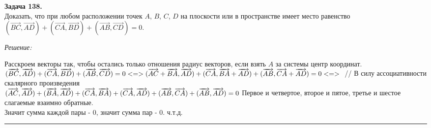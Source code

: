 \documentclass[a4paper, 12pt]{article}
\newenvironment{problem}[2][Задача]
    { \begin{mdframed}[backgroundcolor=gray!10] \textbf{#1 #2.} \\}
    {  \end{mdframed}}
\newenvironment{solution}
    {\textit{Решение: }}
    {\noindent\rule{7in}{1.5pt}}
\begin{document}
\begin{problem}{138}
Доказать, что при любом расположении точек $A$, $B$, $C$, $D$ на плоскости или в пространстве имеет место равенство
$(\overrightarrow{BC},\overrightarrow{AD})+(\overrightarrow{CA},\overrightarrow{BD})+(\overrightarrow{AB},\overrightarrow{CD})=0$.
\end{problem}
\begin{solution}

Расскроем векторы так, чтобы остались только отношения радиус векторов, если взять $A$ за системы центр координат. \\
$
(\overrightarrow{BC},\overrightarrow{AD}) +
(\overrightarrow{CA},\overrightarrow{BD}) +
(\overrightarrow{AB},\overrightarrow{CD}) = 0
<=> \\
(\overrightarrow{AC}+\overrightarrow{BA},\overrightarrow{AD}) +
(\overrightarrow{CA},\overrightarrow{BA} + \overrightarrow{AD}) +
(\overrightarrow{AB},\overrightarrow{CA} + \overrightarrow{AD}) = 0
<=> \\
$
// В силу ассоциативности скалярного произведения \\
$
(\overrightarrow{AC}, \overrightarrow{AD}) + (\overrightarrow{BA}, \overrightarrow{AD}) +
(\overrightarrow{CA}, \overrightarrow{BA}) + (\overrightarrow{CA}, \overrightarrow{AD}) +
(\overrightarrow{AB}, \overrightarrow{CA}) + (\overrightarrow{AB}, \overrightarrow{AD}) = 0 \\
$
Первое и четвертое, второе и пятое, третье и шестое слагаемые взаимно обратные. \\
Значит сумма каждой пары - 0, значит сумма пар - 0. ч.т.д.

\end{solution}
\end{document}
